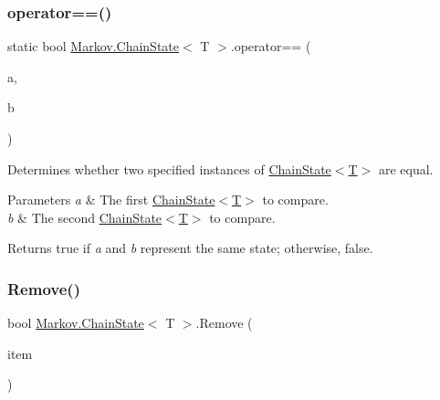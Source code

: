 \subsubsection{\texorpdfstring{operator==()}{operator==()}}
{\footnotesize\ttfamily static bool \mbox{\hyperlink{class_markov_1_1_chain_state}{Markov.\+Chain\+State}}$<$ T $>$.operator== (\begin{DoxyParamCaption}\item[{\mbox{\hyperlink{class_markov_1_1_chain_state}{Chain\+State}}$<$ T $>$}]{a,  }\item[{\mbox{\hyperlink{class_markov_1_1_chain_state}{Chain\+State}}$<$ T $>$}]{b }\end{DoxyParamCaption})\hspace{0.3cm}{\ttfamily [static]}}



Determines whether two specified instances of \mbox{\hyperlink{class_markov_1_1_chain_state_a350f2699a1eb55d8b041ff394c6ae3d4}{Chain\+State$<$\+T$>$}} are equal. 


\begin{DoxyParams}{Parameters}
{\em a} & The first \mbox{\hyperlink{class_markov_1_1_chain_state_a350f2699a1eb55d8b041ff394c6ae3d4}{Chain\+State$<$\+T$>$}} to compare.\\
\hline
{\em b} & The second \mbox{\hyperlink{class_markov_1_1_chain_state_a350f2699a1eb55d8b041ff394c6ae3d4}{Chain\+State$<$\+T$>$}} to compare.\\
\hline
\end{DoxyParams}
\begin{DoxyReturn}{Returns}
true if {\itshape a}  and {\itshape b}  represent the same state; otherwise, false.
\end{DoxyReturn}
\mbox{\label{class_markov_1_1_chain_state_a14ba6dd48c8f96ae8c396779ac6fbbc3}} 
\subsubsection{\texorpdfstring{Remove()}{Remove()}}
{\footnotesize\ttfamily bool \mbox{\hyperlink{class_markov_1_1_chain_state}{Markov.\+Chain\+State}}$<$ T $>$.Remove (\begin{DoxyParamCaption}\item[{T}]{item }\end{DoxyParamCaption})}






